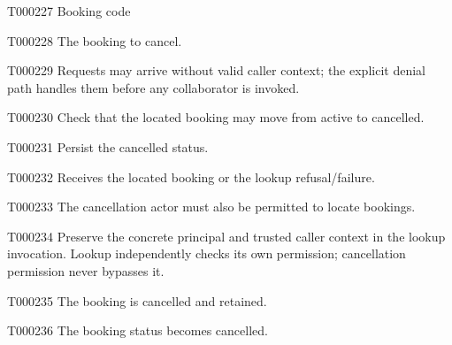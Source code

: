 \documentclass[11pt,a4paper]{article}
\begin{document}
\begin{atlastext}{T000227}
Booking code
\end{atlastext}
\begin{atlasparagraph}{T000228}
The booking to cancel.
\end{atlasparagraph}
\begin{atlasparagraph}{T000229}
Requests may arrive without valid caller context; the explicit denial path handles them before any collaborator is invoked.
\end{atlasparagraph}
\begin{atlasparagraph}{T000230}
Check that the located booking may move from active to cancelled.
\end{atlasparagraph}
\begin{atlasparagraph}{T000231}
Persist the cancelled status.
\end{atlasparagraph}
\begin{atlasparagraph}{T000232}
Receives the located booking or the lookup refusal/failure.
\end{atlasparagraph}
\begin{atlasparagraph}{T000233}
The cancellation actor must also be permitted to locate bookings.
\end{atlasparagraph}
\begin{atlasparagraph}{T000234}
Preserve the concrete principal and trusted caller context in the lookup invocation. Lookup independently checks its own permission; cancellation permission never bypasses it.
\end{atlasparagraph}
\begin{atlasparagraph}{T000235}
The booking is cancelled and retained.
\end{atlasparagraph}
\begin{atlasparagraph}{T000236}
The booking status becomes cancelled.
\end{atlasparagraph}
\end{document}
